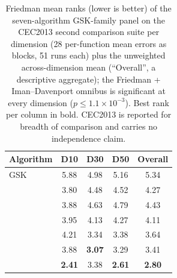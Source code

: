 \begin{table}[H]
\caption{Friedman mean ranks (lower is better) of the seven-algorithm
GSK-family panel on the CEC2013 second comparison suite per dimension
(28 per-function mean errors as blocks, 51 runs each) plus the
unweighted across-dimension mean (``Overall'', a descriptive
aggregate); the Friedman + Iman--Davenport omnibus is significant at
every dimension ($p \leq 1.1 \times 10^{-3}$). Best rank per column in
bold. CEC2013 is reported for breadth of comparison and carries no
independence claim. }\label{tab:friedman-cec2013}
\centering
\tablesize{\footnotesize}
\zebra
\begin{tabular}{lcccc}
\toprule
\textbf{Algorithm} & \textbf{D10} & \textbf{D30} & \textbf{D50} & \textbf{Overall} \\
\midrule
GSK & 5.88 & 4.98 & 5.16 & 5.34 \\
\agsk{} & 3.80 & 4.48 & 4.52 & 4.27 \\
\apgsk{} & 3.88 & 4.63 & 4.79 & 4.43 \\
\fdbagsk{} & 3.95 & 4.13 & 4.27 & 4.11 \\
\atmals{} & 4.21 & 3.34 & 3.38 & 3.64 \\
\egsk{} & 3.88 & \textbf{3.07} & 3.29 & 3.41 \\
\dtgsk{} & \textbf{2.41} & 3.38 & \textbf{2.61} & \textbf{2.80} \\
\bottomrule
\end{tabular}
\end{table}

